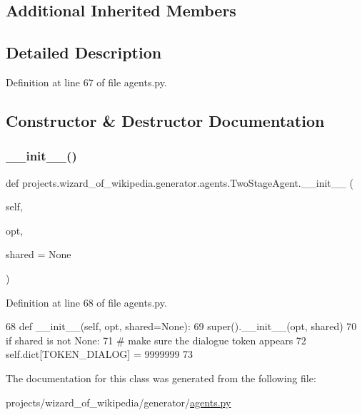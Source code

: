 \subsection*{Additional Inherited Members}


\subsection{Detailed Description}


Definition at line 67 of file agents.\+py.



\subsection{Constructor \& Destructor Documentation}
\mbox{\label{classprojects_1_1wizard__of__wikipedia_1_1generator_1_1agents_1_1TwoStageAgent_a5aae49d192aac40f8fde1b1c42409261}} 
\subsubsection{\texorpdfstring{\+\_\+\+\_\+init\+\_\+\+\_\+()}{\_\_init\_\_()}}
{\footnotesize\ttfamily def projects.\+wizard\+\_\+of\+\_\+wikipedia.\+generator.\+agents.\+Two\+Stage\+Agent.\+\_\+\+\_\+init\+\_\+\+\_\+ (\begin{DoxyParamCaption}\item[{}]{self,  }\item[{}]{opt,  }\item[{}]{shared = {\ttfamily None} }\end{DoxyParamCaption})}



Definition at line 68 of file agents.\+py.


\begin{DoxyCode}
68     \textcolor{keyword}{def }\_\_init\_\_(self, opt, shared=None):
69         super().\_\_init\_\_(opt, shared)
70         \textcolor{keywordflow}{if} shared \textcolor{keywordflow}{is} \textcolor{keywordflow}{not} \textcolor{keywordtype}{None}:
71             \textcolor{comment}{# make sure the dialogue token appears}
72             self.dict[TOKEN\_DIALOG] = 9999999
73 
\end{DoxyCode}


The documentation for this class was generated from the following file\+:\begin{DoxyCompactItemize}
\item 
projects/wizard\+\_\+of\+\_\+wikipedia/generator/\hyperlink{projects_2wizard__of__wikipedia_2generator_2agents_8py}{agents.\+py}\end{DoxyCompactItemize}
